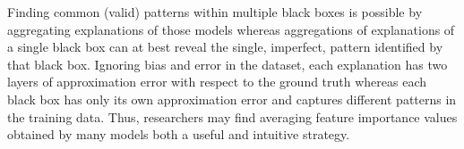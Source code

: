 \documentclass[mnsc,blindrev]{informs3}
\begin{document}
            Finding common (valid) patterns within multiple black boxes is possible by aggregating explanations of those models whereas aggregations of explanations of a single black box can at best reveal the single, imperfect, pattern identified by that black box. Ignoring bias and error in the dataset, each explanation has two layers of approximation error with respect to the ground truth whereas each black box has only its own approximation error and captures different patterns in the training data. Thus, researchers may find averaging feature importance values obtained by many models both a useful and intuitive strategy\citep{dong2020variable,donnelly2023rashomon}.  %
            
\end{document}
